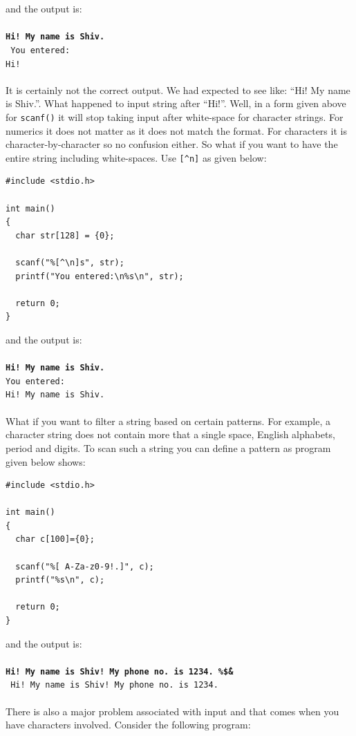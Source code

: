 and the output is:
\\\\\texttt{\textbf{Hi! My name is Shiv.\\}
You entered:\\
Hi!\\\\}
It is certainly not the correct output. We had expected to see like: ``Hi! My
name is Shiv.''. What happened to input string after ``Hi!''. Well, in a form
given above for \texttt{scanf()} it will stop taking input after white-space
for character strings. For numerics it does not matter as it does not match the
format. For characters it is character-by-character so no confusion either. So
what if you want to have the entire string including white-spaces. Use
\texttt{[\^{}n]} as given below:

\begin{Verbatim}[frame=single]
#include <stdio.h>

int main()
{
  char str[128] = {0};

  scanf("%[^\n]s", str);
  printf("You entered:\n%s\n", str);

  return 0;
}
\end{Verbatim}

and the output is:
\\\\\texttt{\textbf{Hi! My name is Shiv.}\\
You entered:\\
Hi! My name is Shiv.\\\\}
What if you want to filter a string based on certain patterns. For example, a
character string does not contain more that a single space, English alphabets,
period and digits. To scan such a string you can define a pattern as program
given below shows:

\begin{Verbatim}[frame=single]
#include <stdio.h>

int main()
{
  char c[100]={0};

  scanf("%[ A-Za-z0-9!.]", c);
  printf("%s\n", c);

  return 0;
}
\end{Verbatim}

and the output is:
\\\\\texttt{\textbf{Hi! My name is Shiv! My phone no. is 1234. \%\^\$\&\*\\}
Hi! My name is Shiv! My phone no. is 1234.\\\\}
There is also a major problem associated with input and that comes when you
have characters involved. Consider the following program:

